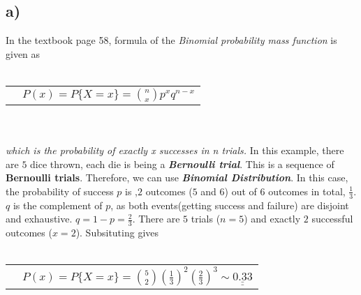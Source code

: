 \documentclass[12pt]{article}
\begin{document}
\subsection*{a)}
In the textbook page 58, formula of the \textit{Binomial probability mass function} is given as
\\ \\
\begin{tabular}{l l}
    & $P (x) = P \{X = x\} = \binom nx p^xq^{n-x}$\\
\end{tabular}
\\ \\
\textit{which is the probability of exactly x successes in n trials.} In this example,
there are $5$ dice thrown, each die is being a \textit{\textbf{Bernoulli trial}}. This 
is a sequence of \textbf{Bernoulli trials}. Therefore, we can use \textit{\textbf{Binomial Distribution}}.
In this case, the probability of success $p$ is ,$2$ outcomes ($5$ and $6$) out of $6$ outcomes in total, $\frac{1}{3}$.
$q$ is the complement of $p$, as both events(getting success and failure) are disjoint and exhaustive. $q=1-p=\frac{2}{3}$. 
There are $5$ trials ($n=5$) and exactly $2$ successful outcomes ($x=2$). Subsituting gives
\\ \\
\begin{tabular}{l l}
    & $P (x) = P \{X = x\} = \binom 52 (\frac{1}{3})^2(\frac{2}{3})^3 \sim \underline{\underline{0.33}}$\\
\end{tabular}
\\ \\
\end{document}
